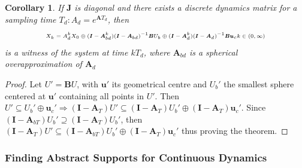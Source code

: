 \documentclass[twocolumn]{autart}    %
\newcommand{\mat}[1]{\boldsymbol{#1}}
\renewcommand{\vec}[1]{\boldsymbol{#1}}
\newtheorem{corollary}{Corollary}
\newtheorem{proof}{Proof}
\begin{document}
\begin{corollary}
 If $\mat{J}$ is diagonal and there exists a discrete dynamics matrix for a sampling time $T_d :  A_d=e^{\mat{A} T_d}$, then 
 \begin{equation}
 \tiny
 X_k=A_d^kX_0 \oplus (\mat{I}-\mat{A}_{bd}^k)(\mat{I}-\mat{A}_{bd})^{-1}\mat{B}U_b \oplus (\mat{I}-\mat{A}_d^k)(\mat{I}-\mat{A}_d)^{-1}\mat{B}\vec{u}_c\nonumber\\
 k \in (0,\infty)
 \end{equation}
  is a witness of the system at time $kT_d$, where $\mat{A}_{bd}$ is a spherical overapproximation of $\mat{A}_d$
\end{corollary}
 \begin{proof}
Let $U'=\mat{B}U$, with $\vec{u}'$ its geometrical centre and $U_b'$ the smallest sphere centered at $\vec{u}'$ containing all points in $U'$.
Then $U'\subseteq U_b' \oplus \vec{u}_c' \Rightarrow (\mat{I}-\mat{A}_T)U' \subseteq (\mat{I}-\mat{A}_T)U_b' \oplus (\mat{I}-\mat{A}_T)\vec{u}_c'$. Since $ (\mat{I}-\mat{A}_{bT})U_b'\supseteq  (\mat{I}-\mat{A}_T)U_b'$, then $(\mat{I}-\mat{A}_T)U' \subseteq (\mat{I}-\mat{A}_{bT})U_b' \oplus (\mat{I}-\mat{A}_T)\vec{u}_c'$ thus proving the theorem.
  
\end{proof}

 \subsubsection{Finding Abstract Supports for Continuous Dynamics}
 \label{sec:cont_aasup}
\end{document}
